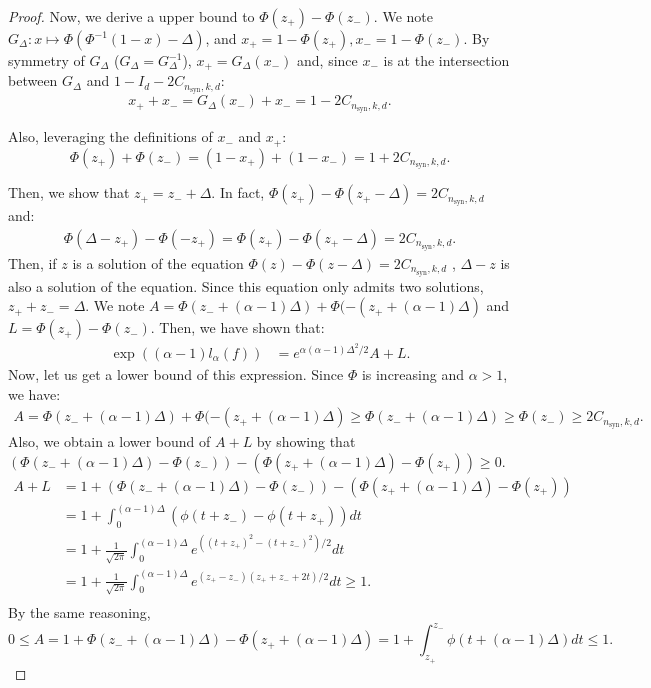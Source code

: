 \documentclass{article}
\theoremstyle{plain}
\theoremstyle{definition}
\theoremstyle{remark}
\begin{document}
\begin{proof}
Now, we derive a upper bound to $\Phi(z_+) - \Phi(z_-)$. We note $G_\Delta : x \mapsto \Phi(\Phi^{-1}(1-x) - \Delta)$, and $x_+ = 1-\Phi(z_+), x_- = 1- \Phi(z_-)$. By symmetry of $G_\Delta$ ($G_\Delta = G_\Delta^{-1}$), $x_+ = G_\Delta(x_-)$ and, since $x_-$ is at the intersection between $G_\Delta$ and $1 - I_d - 2C_{n_{\text{syn}},k,d}$:
\[x_+ + x_- = G_\Delta(x_-) + x_- = 1 - 2C_{n_{\text{syn}},k,d}.\]

Also, leveraging the definitions of $x_-$ and $x_+$:
\[\Phi(z_+) + \Phi(z_-) = (1-x_+) + (1-x_-) = 1+2C_{n_{\text{syn}},k,d}.\]

Then, we show that $z_+ = z_- + \Delta$. In fact, $\Phi(z_+) - \Phi(z_+-\Delta) = 2C_{n_{\text{syn}},k,d}$ and: 
\begin{align*}
    \Phi(\Delta - z_+) - \Phi(-z_+) = \Phi(z_+) - \Phi(z_+ - \Delta) = 2C_{n_{\text{syn}},k,d}.
\end{align*}
Then, if $z$ is a solution of the equation $\Phi(z) - \Phi(z-\Delta) = 2C_{n_{\text{syn}},k,d}$ , $\Delta-z$ is also a solution of the equation. Since this equation only admits two solutions, $z_+ + z_- = \Delta$.
We note $A = \Phi(z_- + (\alpha-1)\Delta) +\Phi(-(z_+ + (\alpha-1)\Delta)$ and $L = \Phi(z_+) - \Phi(z_-)$. Then, we have shown that:
\begin{align*}
        \exp((\alpha-1)l_\alpha(f)) &= e^{\alpha(\alpha-1)\Delta^2/2} A+ L.
\end{align*}
Now, let us get a lower bound of this expression. Since $\Phi$ is increasing and $\alpha > 1$, we have:
\begin{align*}
    A = \Phi(z_- + (\alpha-1)\Delta) +\Phi(-(z_+ + (\alpha-1)\Delta) \geq \Phi(z_- + (\alpha-1)\Delta) \geq \Phi(z_-)  \geq 2C_{n_{\text{syn}},k,d}.
\end{align*}
Also, we obtain a lower bound of $A+L$ by showing that $(\Phi(z_- + (\alpha-1)\Delta)- \Phi(z_-)) -(\Phi(z_+ + (\alpha-1)\Delta) - \Phi(z_+)) \geq 0$.
\begin{align*}
    A+L &= 1+ (\Phi(z_- + (\alpha-1)\Delta)- \Phi(z_-)) -(\Phi(z_+ + (\alpha-1)\Delta) - \Phi(z_+))\\
    &= 1+ \int_{0}^{ (\alpha-1)\Delta} (\phi(t+z_-) -  \phi(t+z_+)) dt\\
    &= 1+ \frac{1}{\sqrt{2\pi}}\int_{0}^{ (\alpha-1)\Delta} e^{((t+z_+)^2 - (t+z_-)^2)/2} dt\\
    &= 1+ \frac{1}{\sqrt{2\pi}}\int_{0}^{ (\alpha-1)\Delta} e^{(z_+-z_-)(z_+ + z_- + 2t)/2} dt \geq 1.\\
\end{align*}
By the same reasoning,
\[0 \leq A = 1+ \Phi(z_- + (\alpha-1)\Delta) -\Phi(z_+ + (\alpha-1)\Delta) = 1 + \int_{z_+}^{z_-} \phi(t + (\alpha-1)\Delta) dt \leq 1.\]


\end{proof}
\end{document}
